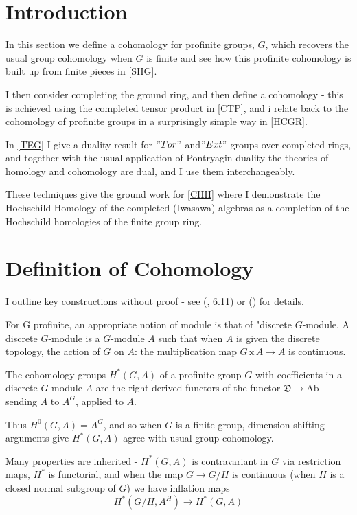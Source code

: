 
\section{Introduction}

In this section we define a cohomology for profinite groups, $G$,  which recovers the usual group cohomology when $G$ is finite and see how this profinite cohomology  is built up from finite pieces in \ref{SHG}.

I then consider completing the ground ring, and then define a cohomology  - this is achieved using the completed tensor product in \ref{CTP}, and i relate back to the cohomology of profinite groups in a surprisingly simple way in \ref{HCGR}.

In \ref{TEG} I give a duality result for $"Tor"$ and$"Ext"$ groups over completed rings, and together with the usual application of Pontryagin duality the theories of homology and cohomology are dual, and I use them interchangeably.

These techniques give the ground work for \ref{CHH} where I demonstrate the Hochschild Homology of the completed (Iwasawa) algebras as a completion of the Hochschild homologies of the finite group ring.





\section{Definition of Cohomology}

I outline key constructions without proof - see (\cite{W}, 6.11) or (\cite{Se}) for details.

For G profinite, an appropriate notion of module is that of "discrete $G$-module. A discrete $G$-module is a $G$-module $A$ such that when $A$ is given the discrete topology, the action of $G$ on $A$: the multiplication map $G\,\text{x}\, A\rightarrow A$ is continuous.

The cohomology groups $H^*(G,A)$ of a profinite group $G$ with coefficients in a discrete $G$-module $A$ are the right derived functors of the functor $\mathfrak D\rightarrow \text{Ab}$ sending $A$ to $A^G$, applied to $A$.

Thus $H^0(G,A) = A^G$, and so when $G$ is a finite group, dimension shifting arguments give $H^*(G,A)$ agree with usual group cohomology.

Many properties are inherited - $H^*(G,A)$ is contravariant in $G$ via restriction maps, $H^*$ is functorial, and when the map $G\rightarrow G/H$ is continuous (when $H$ is a closed normal subgroup of $G$) we have inflation maps
$$H^*(G/H,A^H)\rightarrow H^*(G,A)$$

